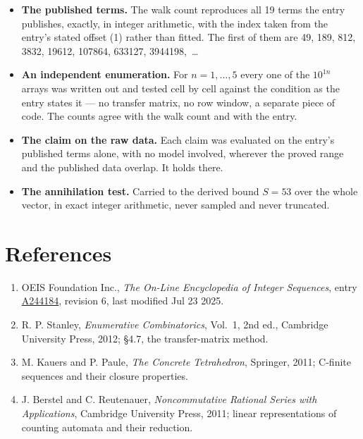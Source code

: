 \documentclass[11pt]{article}
\theoremstyle{definition}
\begin{document}
\begin{itemize}

\item {\bfseries The published terms.} The walk count reproduces all 19 terms the entry publishes, exactly, in integer arithmetic, with the index taken from the entry's stated offset (1) rather than fitted. The first of them are 49, 189, 812, 3832, 19612, 107864, 633127, 3944198,~\dots

\item {\bfseries An independent enumeration.} For $n = 1,\dots,5$ every one of the $10^{1n}$ arrays was written out and tested cell by cell against the condition as the entry states it --- no transfer matrix, no row window, a separate piece of code. The counts agree with the walk count and with the entry.

\item {\bfseries The claim on the raw data.} Each claim was evaluated on the entry's published terms alone, with no model involved, wherever the proved range and the published data overlap. It holds there.

\item {\bfseries The annihilation test.} Carried to the derived bound $S = 53$ over the whole vector, in exact integer arithmetic, never sampled and never truncated.

\end{itemize}

\section{References}

\begin{enumerate}

\item OEIS Foundation Inc., \emph{The On-Line Encyclopedia of Integer Sequences}, entry \href{https://oeis.org/A244184}{A244184}, revision 6, last modified Jul 23 2025.

\item R. P. Stanley, \emph{Enumerative Combinatorics}, Vol.~1, 2nd ed., Cambridge University Press, 2012; \S4.7, the transfer-matrix method.

\item M. Kauers and P. Paule, \emph{The Concrete Tetrahedron}, Springer, 2011; C-finite sequences and their closure properties.

\item J. Berstel and C. Reutenauer, \emph{Noncommutative Rational Series with Applications}, Cambridge University Press, 2011; linear representations of counting automata and their reduction.

\end{enumerate}
\end{document}
